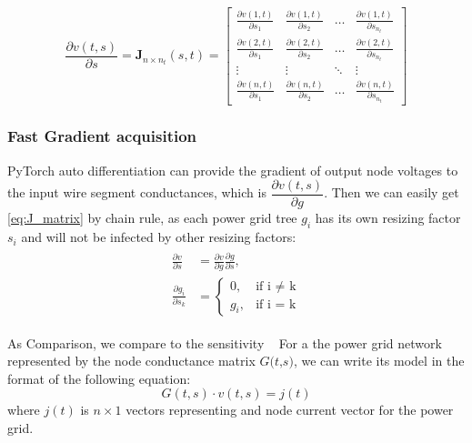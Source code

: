 \begin{equation}
	\label{eq:J_matrix}
	\dfrac{\partial v(t, s)}{\partial s}=
	\mathbf {J}_{n\times n_{t}}(s,t) =
	\begin{bmatrix}
		\frac{\partial v(1,t)}{\partial s_{1}}&\frac{\partial v(1,t)}{\partial s_{2}}&\ldots&\frac{\partial v(1,t)}{\partial s_{n_{t}}}\\
		\frac{\partial v(2,t)}{\partial s_{1}}&\frac{\partial v(2,t)}{\partial s_{2}}&\ldots&\frac{\partial v(2,t)}{\partial s_{n_{t}}}\\
		\vdots&\vdots&\ddots&\vdots\\
		\frac{\partial v(n,t)}{\partial s_{1}}&\frac{\partial v(n,t)}{\partial s_{2}}&\ldots&\frac{\partial v(n,t)}{\partial s_{n_{t}}}
	\end{bmatrix}
\end{equation}



\subsubsection{Fast Gradient acquisition}
PyTorch auto differentiation can provide the gradient of output node voltages to the input wire segment conductances, which is $ \dfrac{\partial v(t, s)}{\partial g}$. Then we can easily get \eqref{eq:J_matrix} by chain rule, as each power grid tree $g_{i}$ has its own resizing factor $s_{i}$ and will not be infected by other resizing factors:
\begin{equation}
	\label{eq:chain_rule}
	\begin{aligned}
	\begin{split}
	\frac{\partial v}{\partial s} & =\frac{\partial v}{\partial g} \frac{\partial g}{\partial s}, \\ 
	\frac{\partial g_{i}}{\partial s_{k}} & = 
    	\begin{cases}
        		0,      &\mbox{if i $\neq$ k} \\ 
        		g_{i},  &\mbox{if i = k} 
    	\end{cases}
	\end{split}
	\end{aligned}
\end{equation}



As Comparison, we compare to the sensitivity ~\cite{Sukharev:2019pg}
For a the power grid network represented by the node conductance matrix $ \textit{G(t,s)}$, we can write its model in the format of the following equation:
\begin{equation}
	\label{eq:gv=i}
	G(t,s)\cdot v(t,s)= j(t)
\end{equation}
where $j(t)$  is $n\times 1$ vectors representing and node current vector for the power grid.


